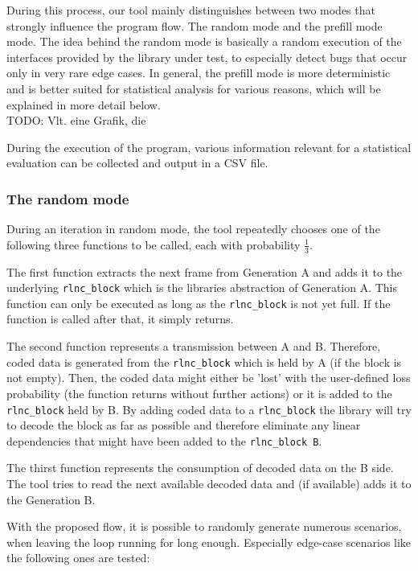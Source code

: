 \documentclass[a4paper,english,10pt]{tumarticle}
\begin{document}
During this process, our tool mainly distinguishes between two modes that strongly influence the program flow. 
The random mode and the prefill mode mode. 
The idea behind the random mode is basically a random execution of the interfaces provided by the library under test, 
to especially detect bugs that occur only in very rare edge cases.
In general, the prefill mode is more deterministic and is better suited for 
statistical analysis for various reasons, which will be explained in more detail below.
\\TODO: Vlt. eine Grafik, die 

During the execution of the program, various information relevant for a statistical evaluation can be collected and output in a CSV file.

\subsubsection{The random mode}\label{sec:random}
During an iteration in random mode, the tool repeatedly chooses one of the following three functions to be called, each with probability $\frac{1}{3}$. 

The first function extracts the next frame from Generation A and adds it to the underlying \texttt{rlnc\_block}
which is the libraries abstraction of Generation A. 
This function can only be executed as long as the \texttt{rlnc\_block} is not yet full. 
If the function is called after that, it simply returns.

The second function represents a transmission between A and B. Therefore, coded data is generated from the 
\texttt{rlnc\_block} which is held by A (if the block is not empty). Then, the coded data might either be 'lost' 
with the user-defined loss probability (the function returns without further actions)
or it is added to the \texttt{rlnc\_block} held by B. By adding coded data to a \texttt{rlnc\_block} the library will try to decode the block as far as possible
and therefore eliminate any linear dependencies that might have been added to the \texttt{rlnc\_block B}.

The thirst function represents the consumption of decoded data on the B side. 
The tool tries to read the next available decoded data and (if available) adds it to the Generation B.

With the proposed flow, it is possible to randomly generate numerous scenarios, when leaving the loop running for long enough. 
Especially edge-case scenarios like the following ones are tested:
\end{document}
